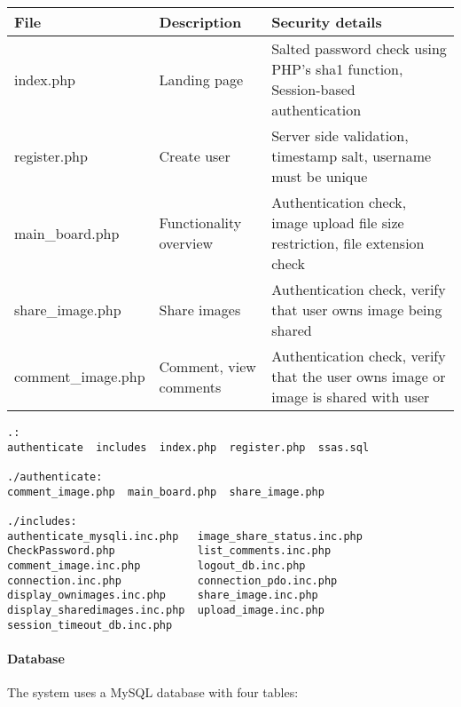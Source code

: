 \documentclass{article}
\begin{document}
\begin{table}
\small
\begin{center}
\begin{tabularx}{\textwidth}{llX}
File & Description & Security details \\ \hline\hline
index.php & Landing page & Salted password check using PHP's sha1 function, Session-based authentication \\ \hline	
register.php & Create user & Server side validation, timestamp salt, username must be unique \\	\hline
main\_board.php & Functionality overview & Authentication check, image upload file size restriction, file extension check \\ \hline	
share\_image.php & Share images & Authentication check, verify that user owns image being shared \\ \hline 	
comment\_image.php & Comment, view comments & Authentication check, verify that the user owns image or image is shared with user \\ \hline	\hline
\end{tabularx}
\end{center}
\end{table}


\begin{verbatim}
.:
authenticate  includes  index.php  register.php  ssas.sql

./authenticate:
comment_image.php  main_board.php  share_image.php

./includes:
authenticate_mysqli.inc.php   image_share_status.inc.php
CheckPassword.php             list_comments.inc.php
comment_image.inc.php         logout_db.inc.php
connection.inc.php            connection_pdo.inc.php        
display_ownimages.inc.php     share_image.inc.php
display_sharedimages.inc.php  upload_image.inc.php
session_timeout_db.inc.php

\end{verbatim}

\paragraph{Database}
The system uses a MySQL database with four tables:
\end{document}
